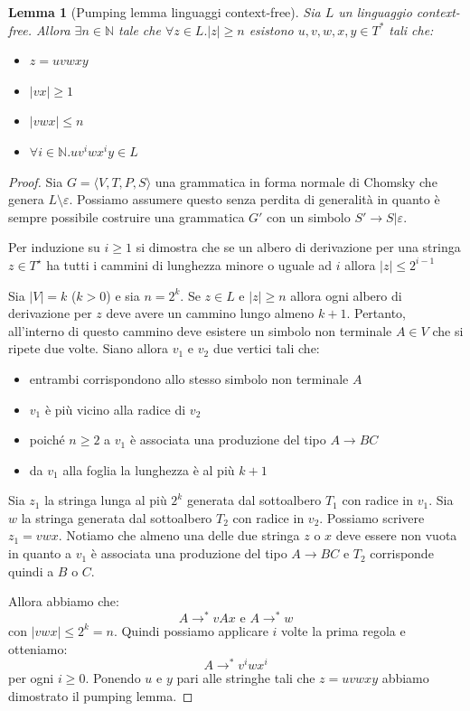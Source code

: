 \documentclass[a4paper,titlepage]{article}
\newtheorem{lemma}{Lemma}[section]
\theoremstyle{definition}
\newcommand{\CFG}{\langle V,T,P,S\rangle}
\begin{document}
\begin{lemma}[Pumping lemma linguaggi context-free]
	Sia $L$ un linguaggio context-free. Allora $\exists n\in\mathbb{N}$ tale che $\forall z\in L.|z|\geq n$ esistono 
	$u,v,w,x,y\in T^*$ tali che:
	\begin{itemize}
		\item $z=uvwxy$
		\item $|vx|\geq 1$
		\item $|vwx|\leq n$
		\item $\forall i\in\mathbb{N}. uv^iwx^iy\in L$
	\end{itemize}
\end{lemma}
\begin{proof}
	Sia $G=\CFG$ una grammatica in forma normale di Chomsky che genera $L\setminus\varepsilon$. Possiamo assumere questo senza perdita di generalità in quanto è sempre possibile costruire una grammatica $G'$ con un simbolo $S'\rightarrow S|\varepsilon$.
	
	Per induzione su $i\geq 1$ si dimostra che se un albero di derivazione per una stringa $z\in T^\star$ ha tutti i cammini di lunghezza minore o uguale ad $i$ allora $|z|\leq 2^{i-1}$
	
	Sia $|V|=k$ ($k>0$) e sia $n=2^k$. Se $z\in L$ e $|z|\geq n$ allora ogni albero di derivazione per $z$ deve avere un cammino lungo almeno $k+1$. Pertanto, all'interno di questo cammino deve esistere un simbolo non terminale $A\in V$ che si ripete due volte. Siano allora $v_1$ e $v_2$ due vertici tali che:
	\begin{itemize}
		\item entrambi corrispondono allo stesso simbolo non terminale $A$
		\item $v_1$ è più vicino alla radice di $v_2$
		\item poiché $n\geq 2$ a $v_1$ è associata una produzione del tipo $A\rightarrow BC$
		\item da $v_1$ alla foglia la lunghezza è al più $k+1$
	\end{itemize}
	
	Sia $z_1$ la stringa lunga al più $2^k$ generata dal sottoalbero $T_1$ con radice in $v_1$. Sia $w$ la stringa generata dal sottoalbero $T_2$ con radice in $v_2$. Possiamo scrivere $z_1=vwx$. Notiamo che almeno una delle due stringa $z$ o $x$ deve essere non vuota in quanto a $v_1$ è associata una produzione del tipo $A\rightarrow BC$ e $T_2$ corrisponde quindi a $B$ o $C$. 
	
	Allora abbiamo che:
	\[
		A\rightarrow^* vAx\text{ e }A\rightarrow^* w
	\]
	con $|vwx|\leq 2^k = n$. Quindi possiamo applicare $i$ volte la prima regola e otteniamo:
	\[
		A\rightarrow^* v^iwx^i
	\]
	per ogni $i\geq 0$. Ponendo $u$ e $y$ pari alle stringhe tali che $z=uvwxy$ abbiamo dimostrato il pumping lemma. 
\end{proof}
\end{document}

